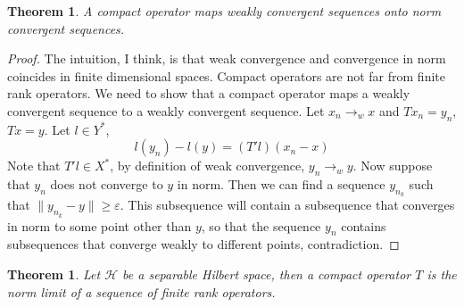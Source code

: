 \documentclass[12pt]{article}
\theoremstyle{plain}
\newtheorem{theorem}[equation]{Theorem}
\theoremstyle{definition}
\theoremstyle{named}
\newcommand{\shH}{\mathscr{H}}
\newcommand{\<}{\langle}
\renewcommand{\>}{\rangle}
\newcommand{\sm}{\varepsilon}
\begin{document}
\begin{theorem}
A compact operator maps weakly convergent sequences onto norm convergent sequences. 
\end{theorem}
\begin{proof}
The intuition, I think, is that weak convergence and convergence in norm coincides in finite dimensional spaces. Compact operators are not far from finite rank operators. We need to show that a compact operator maps a weakly convergent sequence to a weakly convergent sequence. Let $x_n \to_w x$ and $Tx_n = y_n$, $Tx = y$. Let $ l \in Y^*$, 
$$ l(y_n) - l(y) = (T' l)(x_n - x) $$ 
Note that $T' l \in X^*$, by definition of weak convergence, $y_n \to_w y$. Now suppose that $y_n$ does not converge to $y$ in norm. Then we can find a sequence $y_{n_k}$ such that $\|  y_{n_k} - y \| \ge \sm$. This subsequence will contain a subsequence that converges in norm to some point other than $y$, so that the sequence $y_n$ contains subsequences that converge weakly to different points, contradiction. 
\end{proof}

\begin{theorem}
Let $\shH$ be a separable Hilbert space, then a compact operator $T$ is the norm limit of a sequence of finite rank operators. 
\end{theorem}
\end{document}
